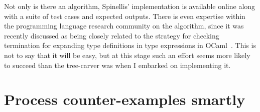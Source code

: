 Not only is there an algorithm, Spinellis' implementation is available
online
along with a suite of test
cases
and expected
outputs.
There is even expertise within the programming language research community on
the algorithm, since it was recently discussed as being closely related to the
strategy for checking termination for expanding type definitions in type
expressions in OCaml~. This is not to say that it
will be easy, but at this stage such an effort seems more likely to succeed
than the tree-carver was when I embarked on implementing it.

\section{Process counter-examples smartly}\label{sec:counter-ex}

